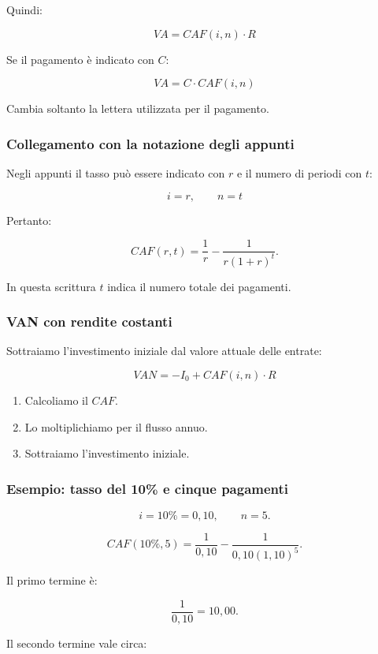 \noindent Quindi:

\[
\boxed{
VA=CAF(i,n)\cdot R
}
\]

\noindent Se il pagamento è indicato con $C$:

\[
\boxed{
VA=C\cdot CAF(i,n)
}
\]

\noindent Cambia soltanto la lettera
utilizzata per il pagamento.


\subsubsection*{Collegamento con la notazione degli appunti}

\noindent Negli appunti il tasso
può essere indicato con $r$
e il numero di periodi con $t$:

\[
\boxed{
i=r,
\qquad
n=t
}
\]

\noindent Pertanto:

\[
CAF(r,t)
=
\frac{1}{r}
-
\frac{1}{r(1+r)^t}.
\]

\noindent In questa scrittura $t$
indica il numero totale dei pagamenti.


\subsubsection*{VAN con rendite costanti}

\noindent Sottraiamo l'investimento iniziale
dal valore attuale delle entrate:

\[
\boxed{
VAN=-I_0+CAF(i,n)\cdot R
}
\]

\begin{enumerate}
    \item Calcoliamo il $CAF$.
    \item Lo moltiplichiamo per il flusso annuo.
    \item Sottraiamo l'investimento iniziale.
\end{enumerate}


\subsubsection*{Esempio: tasso del 10\% e cinque pagamenti}

\[
i=10\%=0{,}10,
\qquad
n=5.
\]

\[
CAF(10\%,5)
=
\frac{1}{0{,}10}
-
\frac{1}{0{,}10(1{,}10)^5}.
\]

\noindent Il primo termine è:

\[
\frac{1}{0{,}10}=10{,}00.
\]

\noindent Il secondo termine vale circa:

